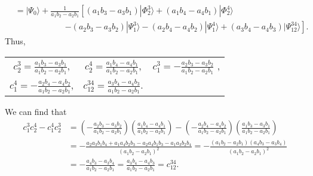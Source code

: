 \documentclass[a4paper]{book}
\newcounter{solution}[chapter]
\begin{document}
\begin{solution}
\begin{itemize}
\begin{align*}
		&= | \Psi_0 \rangle + \frac{1}{ a_1 b_2 - a_2 b_1 } \left[ ( a_1 b_3 - a_3 b_1 ) | \Phi^3_2 \rangle + ( a_1 b_4  - a_4 b_1 ) | \Phi^4_2 \rangle \right. \\
		&\hspace{6em} \left. - ( a_2 b_3 - a_3 b_2 ) | \Psi^3_1 \rangle - ( a_2 b_4 - a_4 b_2 ) | \Psi^4_1 \rangle + ( a_3 b_4  - a_4 b_3 ) | \Psi^{34}_{12} \rangle \right].
	\end{align*}
	Thus,	
	\begin{center}
	\renewcommand{\arraystretch}{2.5}
	\begin{tabular}{ccc}
		${\displaystyle c^3_2 = \frac{ a_1 b_3 - a_3 b_1 }{ a_1 b_2 - a_2 b_1 } }$, & ${\displaystyle c^4_2 = \frac{ a_1 b_4 - a_4 b_1 }{ a_1 b_2 - a_2 b_1 } }$, & ${\displaystyle c^3_1 = -\frac{ a_2 b_3 - a_3 b_2 }{ a_1 b_2 - a_2 b_1 } }$ , \\
		${\displaystyle c^4_1 = -\frac{ a_2 b_4 - a_4 b_2 }{ a_1 b_2 - a_2 b_1 } }$, & ${\displaystyle c^{34}_{12} = \frac{ a_3 b_4 - a_4 b_3 }{ a_1 b_2 - a_2 b_1 } }$.
	\end{tabular}
	\renewcommand{\arraystretch}{1.0}
	\end{center}		
	We can find that
	\begin{align*}
		c^3_1 c^4_2 - c^4_1 c^3_2 &= \left( -\frac{ a_2 b_3 - a_3 b_2 }{ a_1 b_2 - a_2 b_1 } \right) \left( \frac{ a_1 b_4 - a_4 b_1 }{ a_1 b_2 - a_2 b_1 } \right) - \left( -\frac{ a_2 b_4 - a_4 b_2 }{ a_1 b_2 - a_2 b_1 } \right) \left( \frac{ a_1 b_3 - a_3 b_1 }{ a_1 b_2 - a_2 b_1 } \right) \\
		&= - \frac{ a_2 a_3 b_1 b_4 + a_1 a_4 b_2 b_3 - a_2 a_4 b_1 b_3 - a_1 a_3 b_2 b_4 }{ ( a_1 b_2 - a_2 b_1 )^2 } = - \frac{ ( a_1 b_2 - a_2 b_1 )( a_4 b_3 - a_3 b_4 ) }{ ( a_1 b_2 - a_2 b_1 )^2 } \\
		&= - \frac{ a_4 b_3 - a_3 b_4 }{ a_1 b_2 - a_2 b_1  } = \frac{ a_3 b_4 - a_4 b_3 }{ a_1 b_2 - a_2 b_1 } = c^{34}_{12}.
	\end{align*}
	

\end{itemize}
\end{solution}
\end{document}
